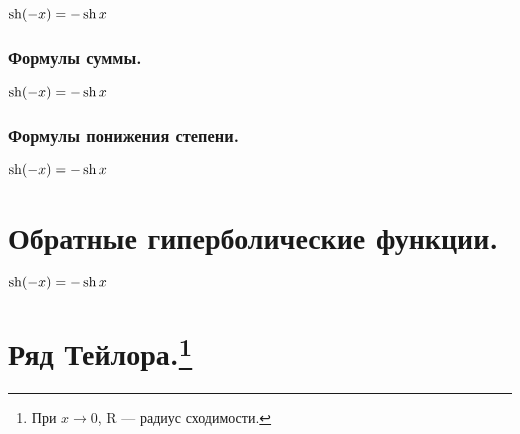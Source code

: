 $\sh (-x) = -\sh x$
\subsubsection{Формулы суммы.}

$\sh (-x) = -\sh x$
\subsubsection{Формулы понижения степени.}

$\sh (-x) = -\sh x$
\section{Обратные гиперболические функции.}
$\sh (-x) = -\sh x$

\section[Ряд Тейлора.]{Ряд Тейлора.\footnote{При $x \to 0$, R --- радиус сходимости.}}
